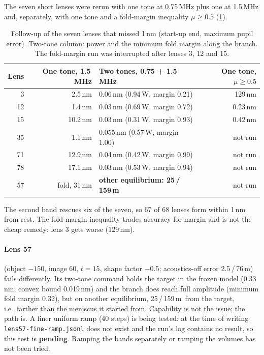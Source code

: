 \documentclass[11pt,a4paper]{article}
\numberwithin{equation}{section}
\newcommand{\um}{\,\textmu m}
\newcommand{\file}[1]{\nolinkurl{#1}}
\begin{document}
The seven short lenses were rerun with one tone at 0.75\,MHz plus one at 1.5\,MHz
and, separately, with one tone and a fold-margin inequality $\mu\ge0.5$
(\cref{tab:followup}).

\begin{table}[htbp]\centering\small
\caption{Follow-up of the seven lenses that missed 1\,nm (start-up end, maximum
pupil error). Two-tone column: power and the minimum fold margin along the
branch. The fold-margin run was interrupted after lenses 3, 12 and 15.}\label{tab:followup}
\begin{tabular}{@{}rrlr@{}}
\toprule
Lens & One tone, 1.5\,MHz & Two tones, 0.75 + 1.5\,MHz & One tone, $\mu\ge0.5$ \\
\midrule
3 & 2.5\,nm & 0.06\,nm (0.94\,W, margin 0.21) & 129\,nm \\
12 & 1.4\,nm & 0.03\,nm (0.69\,W, margin 0.72) & 0.23\,nm \\
15 & 10.2\,nm & 0.03\,nm (0.31\,W, margin 0.93) & 0.42\,nm \\
35 & 1.1\,nm & 0.055\,nm (0.57\,W, margin 1.00) & not run \\
71 & 12.9\,nm & 0.04\,nm (0.42\,W, margin 0.99) & not run \\
78 & 17.1\,nm & 0.03\,nm (0.53\,W, margin 0.94) & not run \\
57 & fold, 31\,nm & \textbf{other equilibrium: 25\,/\,159\um} & not run \\
\bottomrule
\end{tabular}
\end{table}

The second band rescues six of the seven, so 67 of 68 lenses form within 1\,nm
from rest. The fold-margin inequality trades accuracy for margin and is not the
cheap remedy: lens 3 gets worse (129\,nm).

\paragraph{Lens 57} (object $-150$, image 60, $t=15$, shape factor $-0.5$;
acoustics-off error 2.5\,/\,76\um) fails differently. Its two-tone command holds
the target in the frozen model (0.33\,nm; convex bound 0.019\,nm) and the branch
does reach full amplitude (minimum fold margin 0.32), but on another equilibrium,
25\,/\,159\um\ from the target, i.e.\ farther than the meniscus it started from.
Capability is not the issue; the path is. A finer uniform ramp (40 steps) is
being tested: at the time of writing \file{lens57-fine-ramp.jsonl} does not exist
and the run's log contains no result, so this test is \textbf{pending}. Ramping
the bands separately or ramping the volumes has not been tried.
\end{document}
